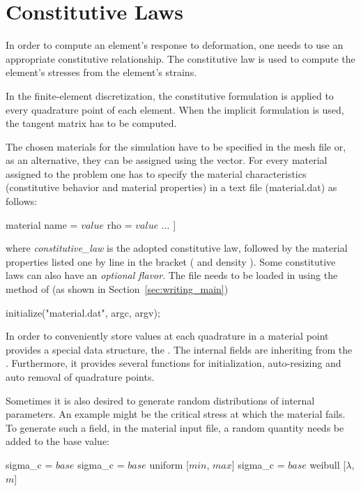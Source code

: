 \section{Constitutive Laws \label{sect:smm:CL}}
In order to compute an element's response to deformation, one needs to
use an appropriate constitutive relationship. The constitutive law is
used to compute the element's stresses from the element's strains.

In the finite-element discretization, the constitutive formulation is
applied to every quadrature point of each element. When the implicit
formulation is used, the tangent matrix has to be computed.

The chosen materials for the simulation have to be specified in the
mesh file or, as an alternative, they can be assigned using the
 vector.  For every material assigned to the
problem one has to specify the material characteristics (constitutive
behavior and material properties) in a text file (\eg material.dat) as
follows:
\begin{cpp}
  material %
     name = $value$
     rho = $value$
     ...
  ]
\end{cpp}
 where \emph{constitutive\_law} is the adopted
constitutive law, followed by the material properties listed one by line in the
bracket (\eg {} and density ). Some constitutive laws can
also have an \emph{optional flavor}. The file needs to be loaded in \akantu
using the  method of \akantu (as shown in
Section~\ref{sec:writing_main})
\begin{cpp}
  initialize("material.dat", argc, argv);
\end{cpp}

In order to conveniently store values at each quadrature in a material
point \akantu provides a special data structure, the
. The internal fields are inheriting from the
.  Furthermore, it provides several functions for
initialization, auto-resizing and auto removal of quadrature points.

Sometimes it is also desired to generate random distributions of
internal parameters. An example might be the critical stress at which the
material fails. To generate such a field, in the material input file,
a random quantity needs be added to the base value:
\begin{cpp}
  sigma_c = $base$
  sigma_c = $base$ uniform [$min$, $max$]
  sigma_c = $base$ weibull [$\lambda$, $m$]
\end{cpp}

